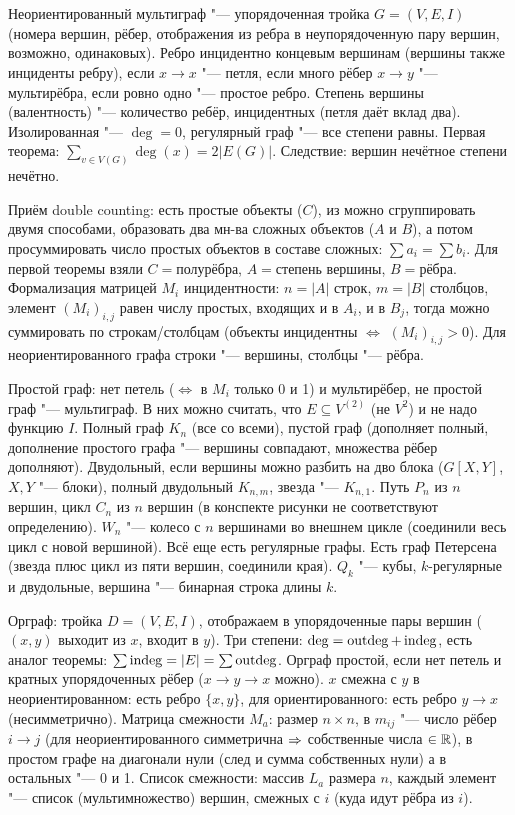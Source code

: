 \section{} %
Неориентированный мультиграф "--- упорядоченная тройка $G=(V, E, I)$ (номера вершин, рёбер, отображения из ребра в неупорядоченную пару вершин, возможно, одинаковых).
Ребро инцидентно концевым вершинам (вершины также инциденты ребру), если $x \to x$ "--- петля, если много рёбер $x \to y$ "--- мультирёбра,
если ровно одно "--- простое ребро.
Степень вершины (валентность) "--- количество ребёр, инцидентных (петля даёт вклад два).
Изолированная "--- $\deg = 0$, регулярный граф "--- все степени равны.
Первая теорема: $\sum_{v \in V(G)} \deg(x) = 2|E(G)|$.
Следствие: вершин нечётное степени нечётно.

Приём double counting: есть простые объекты ($C$), из можно сгруппировать двумя способами, образовать два мн-ва сложных объектов ($A$ и $B$),
а потом просуммировать число простых объектов в составе сложных: $\sum a_i = \sum b_i$.
Для первой теоремы взяли $C=\text{полурёбра}$, $A=\text{степень вершины}$, $B=\text{рёбра}$.
Формализация матрицей $M_i$ инцидентности: $n=|A|$ строк, $m=|B|$ столбцов, элемент $(M_i)_{i,j}$
равен числу простых, входящих и в $A_i$, и в $B_j$, тогда можно суммировать по строкам/столбцам
(объекты инцидентны $\iff$ $(M_i)_{i,j}>0$).
Для неориентированного графа строки "--- вершины, столбцы "--- рёбра.

Простой граф: нет петель ($\iff$ в $M_i$ только 0 и 1) и мультирёбер, не простой граф "--- мультиграф.
В них можно считать, что $E \subseteq V^{(2)}$ (не $V^2$) и не надо функцию $I$.
Полный граф $K_n$ (все со всеми), пустой граф (дополняет полный, дополнение простого графа "--- вершины совпадают, множества рёбер дополняют).
Двудольный, если вершины можно разбить на дво блока ($G[X, Y]$, $X, Y$ "--- блоки), полный двудольный $K_{n,m}$, звезда "--- $K_{n,1}$.
Путь $P_n$ из $n$ вершин, цикл $C_n$ из $n$ вершин (\TODO в конспекте рисунки не соответствуют определению).
$W_n$ "--- колесо с $n$ вершинами во внешнем цикле (соединили весь цикл с новой вершиной).
Всё еще есть регулярные графы.
Есть граф Петерсена (звезда плюс цикл из пяти вершин, соединили края).
$Q_k$ "--- кубы, $k$-регулярные и двудольные, вершина "--- бинарная строка длины $k$.

Орграф: тройка $D=(V,E,I)$, отображаем в упорядоченные пары вершин ($(x, y)$ выходит из $x$, входит в $y$). 
Три степени: $\deg = \operatorname{outdeg} + \operatorname{indeg}$, есть аналог теоремы: $\sum \operatorname{indeg} = |E| = \sum \operatorname{outdeg}$.
Орграф простой, если нет петель и кратных упорядоченных рёбер ($x \to y \to x$ можно).
$x$ смежна с $y$ в неориентированном: есть ребро $\{x, y\}$, для ориентированного: есть ребро $y\to x$ (несимметрично).
Матрица смежности $M_a$: размер $n \times n$, в $m_{ij}$ "--- число рёбер $i\to j$ (для неориентированного симметрична $\Rightarrow$
собственные числа $\in \mathbb{R}$), в простом графе на диагонали нули (след и сумма собственных нули) а в остальных "--- 0 и 1.
Список смежности: массив $L_a$ размера $n$, каждый элемент "--- список (мультимножество) вершин, смежных с $i$ (куда идут рёбра из $i$).

